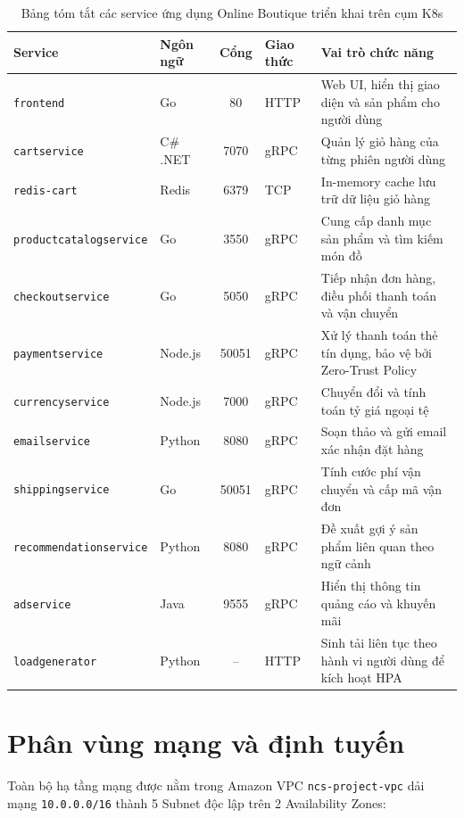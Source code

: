 \begin{table}[H]
    \centering
    \small
    \renewcommand{\arraystretch}{1.2}
    \caption{Bảng tóm tắt các service ứng dụng Online Boutique triển khai trên cụm K8s}
    \label{tab:services_summary}
    \begin{tabularx}{\textwidth}{l l c l X}
        \toprule
        \textbf{Service} & \textbf{Ngôn ngữ} & \textbf{Cổng} & \textbf{Giao thức} & \textbf{Vai trò chức năng} \\
        \midrule
        \texttt{frontend} & Go & 80 & HTTP & Web UI, hiển thị giao diện và sản phẩm cho người dùng \\
        \texttt{cartservice} & C\# .NET & 7070 & gRPC & Quản lý giỏ hàng của từng phiên người dùng \\
        \texttt{redis-cart} & Redis & 6379 & TCP & In-memory cache lưu trữ dữ liệu giỏ hàng \\
        \texttt{productcatalogservice} & Go & 3550 & gRPC & Cung cấp danh mục sản phẩm và tìm kiếm món đồ \\
        \texttt{checkoutservice} & Go & 5050 & gRPC & Tiếp nhận đơn hàng, điều phối thanh toán và vận chuyển \\
        \texttt{paymentservice} & Node.js & 50051 & gRPC & Xử lý thanh toán thẻ tín dụng, bảo vệ bởi Zero-Trust Policy \\
        \texttt{currencyservice} & Node.js & 7000 & gRPC & Chuyển đổi và tính toán tỷ giá ngoại tệ \\
        \texttt{emailservice} & Python & 8080 & gRPC & Soạn thảo và gửi email xác nhận đặt hàng \\
        \texttt{shippingservice} & Go & 50051 & gRPC & Tính cước phí vận chuyển và cấp mã vận đơn \\
        \texttt{recommendationservice} & Python & 8080 & gRPC & Đề xuất gợi ý sản phẩm liên quan theo ngữ cảnh \\
        \texttt{adservice} & Java & 9555 & gRPC & Hiển thị thông tin quảng cáo và khuyến mãi \\
        \texttt{loadgenerator} & Python & -- & HTTP & Sinh tải liên tục theo hành vi người dùng để kích hoạt HPA \\
        \bottomrule
    \end{tabularx}
\end{table}

\section{Phân vùng mạng và định tuyến}
Toàn bộ hạ tầng mạng được nằm trong Amazon VPC \texttt{ncs-project-vpc} dải mạng \texttt{10.0.0.0/16} thành 5 Subnet độc lập trên 2 Availability Zones:

